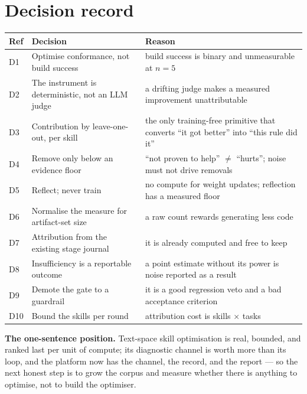 \documentclass[11pt,a4paper]{article}
\begin{document}
\section{Decision record}

\begin{center}
\begin{tabular}{@{}p{}p{}p{}@{}}
\toprule
\textbf{Ref} & \textbf{Decision} & \textbf{Reason} \\
\midrule
D1 & Optimise conformance, not build success & build success is binary and
unmeasurable at $n=5$ \\
D2 & The instrument is deterministic, not an LLM judge & a drifting judge makes a
measured improvement unattributable \\
D3 & Contribution by leave-one-out, per skill & the only training-free primitive
that converts ``it got better'' into ``this rule did it'' \\
D4 & Remove only below an evidence floor & ``not proven to help'' $\neq$ ``hurts'';
noise must not drive removals \\
D5 & Reflect; never train & no compute for weight updates; reflection has a
measured floor \\
D6 & Normalise the measure for artifact-set size & a raw count rewards generating
less code \\
D7 & Attribution from the existing stage journal & it is already computed and free
to keep \\
D8 & Insufficiency is a reportable outcome & a point estimate without its power is
noise reported as a result \\
D9 & Demote the gate to a guardrail & it is a good regression veto and a bad
acceptance criterion \\
D10 & Bound the skills per round & attribution cost is skills $\times$ tasks \\
\bottomrule
\end{tabular}
\end{center}

\begin{notebox}
\textbf{The one-sentence position.} Text-space skill optimisation is real, bounded,
and ranked last per unit of compute; its diagnostic channel is worth more than its
loop, and the platform now has the channel, the record, and the report --- so the
next honest step is to grow the corpus and measure whether there is anything to
optimise, not to build the optimiser.
\end{notebox}
\end{document}
